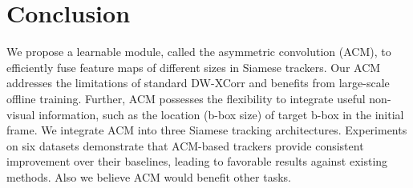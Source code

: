 \documentclass[10pt,twocolumn,letterpaper,final]{cvpr}
\begin{document}
\begin{table}[t] 
\footnotesize
\centering
{}
\caption{\textbf{Ablation study on VOT2016~\cite{kristan2016the} and OTB-100\cite{wu2015object}}. We show the results using three different baseline tracking architectures. All speeds are reported on a GTX1080Ti GPU. We also show our ACM with only AC and without the integration of prior non-visual information. In all cases, our final ACM achieves consistent improvement in tracking performance over the baseline architectures. The best scores are highlighted in bold in each case.
}
\label{Table:ablation}\end{table}






\section{Conclusion}
We propose a learnable module, called the asymmetric convolution (ACM), to efficiently fuse feature maps of different sizes in Siamese trackers. Our ACM addresses the limitations of standard DW-XCorr and benefits from large-scale offline training. Further, ACM possesses the flexibility to integrate useful non-visual information, such as the location (b-box size) of target b-box in the initial frame. We integrate ACM into three Siamese tracking architectures. Experiments on six datasets demonstrate that ACM-based trackers provide consistent improvement over their baselines, leading to favorable results against existing methods.  Also we believe ACM would benefit other tasks.











\clearpage
\end{document}
